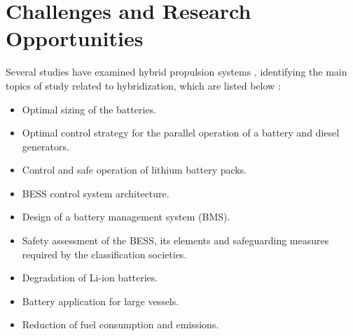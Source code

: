 


\section{Challenges and Research Opportunities}

Several studies have examined hybrid propulsion systems \cite{LSZ}, identifying the main topics of study related to hybridization, which are listed below \cite{Marcin}:
\begin{itemize}
	\item Optimal sizing of the batteries.
	\item Optimal control strategy for the parallel operation of a battery and diesel generators.
	\item Control and safe operation of lithium battery packs.
	\item BESS control system architecture.
	\item Design of a battery management system (BMS).
	\item Safety assessment of the BESS,
its elements and safeguarding measures required by the classification societies.
\item Degradation of Li-ion batteries.
\item Battery application for large vessels.
\item Reduction of fuel consumption and emissions.
\end{itemize}


